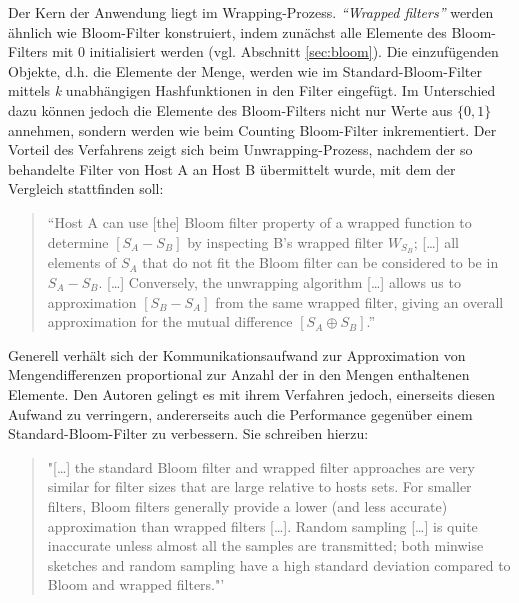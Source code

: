 Der Kern der Anwendung liegt im Wrapping-Prozess. \textit{"`Wrapped filters"'} \cite{Agarwal2006} werden ähnlich wie Bloom-Filter konstruiert, indem zunächst alle Elemente des Bloom-Filters mit 0 initialisiert werden (vgl. Abschnitt \ref{sec:bloom}). Die einzufügenden Objekte, d.h. die Elemente der Menge, werden wie im Standard-Bloom-Filter mittels \textit{k} unabhängigen Hashfunktionen in den Filter eingefügt. Im Unterschied dazu können jedoch die Elemente des Bloom-Filters nicht nur Werte aus $\{0,1\}$ annehmen, sondern werden wie beim Counting Bloom-Filter inkrementiert. Der Vorteil des Verfahrens zeigt sich beim Unwrapping-Prozess, nachdem der so behandelte Filter von Host A an  Host B übermittelt wurde, mit dem der Vergleich stattfinden soll: 
\begin{quote}
"`Host A can use [the] Bloom filter property of a wrapped function to determine $[S_A - S_B]$ by inspecting B's wrapped filter $W_{S_B}$; [\dots] all elements of $S_A$ that do not fit the Bloom filter can be considered to be in $S_A - S_B$. [\dots] Conversely, the unwrapping algorithm [\dots] allows us to approximation $[S_B - S_A]$ from the same wrapped filter, giving an overall approximation for the mutual difference $[S_A\oplus S_B]$."' \cite{Agarwal2006}
\end{quote}
Generell verhält sich der Kommunikationsaufwand zur Approximation von Mengendifferenzen proportional zur Anzahl der in den Mengen enthaltenen Elemente. Den Autoren gelingt es mit ihrem Verfahren jedoch, einerseits diesen Aufwand zu verringern, andererseits auch die Performance gegenüber einem Standard-Bloom-Filter zu verbessern. Sie schreiben hierzu: 
\begin{quote}
"[\dots] the standard Bloom filter and wrapped filter approaches are very similar for filter sizes that are large relative to hosts sets. For smaller filters, Bloom filters generally provide a lower (and less accurate) approximation than wrapped filters [\dots]. Random sampling [\dots] is quite inaccurate unless almost all the samples are transmitted; both minwise sketches and random sampling have a high standard deviation compared to Bloom and wrapped filters."' \cite{Agarwal2006}
\end{quote}
